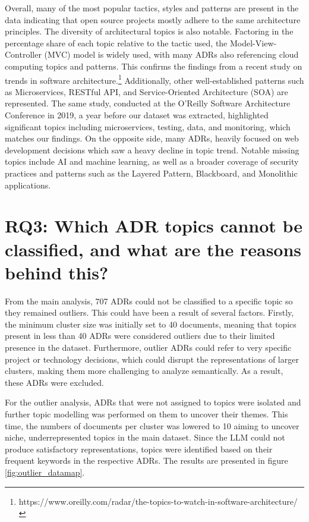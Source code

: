         

        Overall, many of the most popular tactics, styles and patterns are present in the data indicating that open source projects mostly adhere to the same architecture principles. The diversity of architectural topics is also notable. Factoring in the percentage share of each topic relative to the tactic used, the Model-View-Controller (MVC) model is widely used, with many ADRs also referencing cloud computing topics and patterns. This confirms the findings from a recent study on trends in software architecture.\footnote{https://www.oreilly.com/radar/the-topics-to-watch-in-software-architecture/} Additionally, other well-established patterns such as Microservices, RESTful API, and Service-Oriented Architecture (SOA) are represented. The same study, conducted at the O’Reilly Software Architecture Conference in 2019, a year before our dataset was extracted, highlighted significant topics including microservices, testing, data, and monitoring, which matches our findings. On the opposite side, many ADRs, heavily focused on web development decisions which saw a heavy decline in topic trend. Notable missing topics include AI and machine learning, as well as a broader coverage of security practices and patterns such as the Layered Pattern, Blackboard, and Monolithic applications.
        
    \section{RQ3: Which ADR topics cannot be classified, and what are the reasons behind this?}
        From the main analysis, 707 ADRs could not be classified to a specific topic so they remained outliers. This could have been a result of several factors. Firstly, the minimum cluster size was initially set to 40 documents, meaning that topics present in less than 40 ADRs were considered outliers due to their limited presence in the dataset. Furthermore, outlier ADRs could refer to very specific project or technology decisions, which could disrupt the representations of larger clusters, making them more challenging to analyze semantically. As a result, these ADRs were excluded.
        
        For the outlier analysis, ADRs that were not assigned to topics were isolated and further topic modelling was performed on them to uncover their themes. This time, the numbers of documents per cluster was lowered to 10 aiming to uncover niche, underrepresented topics in the main dataset. Since the LLM could not produce satisfactory representations, topics were identified based on their frequent keywords in the respective ADRs. The results are presented in figure \ref{fig:outlier_datamap}.
        
